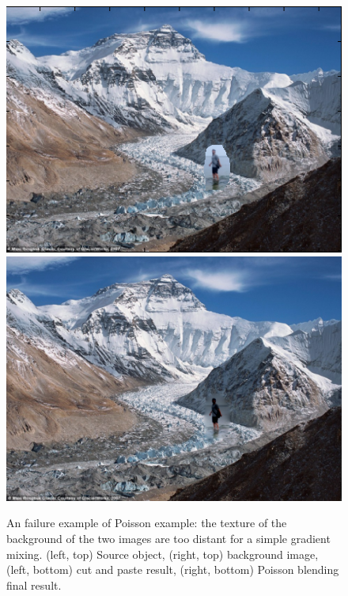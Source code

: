 \documentclass[11pt]{article}
\begin{document}
\begin{figure} [ht]
\begin{center}
\includegraphics[scale=0.49]{results_poisson/set2/im4.png} 
\includegraphics[scale=0.44]{results_poisson/set2/im5.png}   
\caption{An failure example of Poisson example: the texture of the background of the two images are too distant for a simple gradient mixing. (left, top) Source object, (right, top) background image,   (left, bottom) cut and paste result, (right, bottom) Poisson blending final result.}
\label{3}
\end{center}
\end{figure}

\quad
\end{document}
